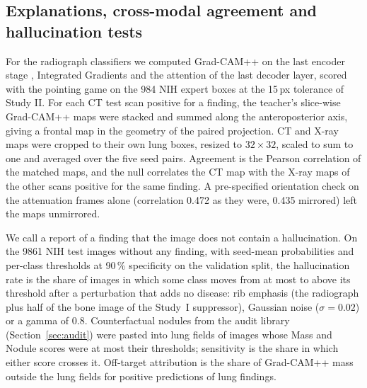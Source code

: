\subsection{Explanations, cross-modal agreement and hallucination tests}
\label{sec:xm_xai}
For the radiograph classifiers we computed Grad-CAM++ on the last encoder stage \citep{chattopadhay2018gradcampp}, Integrated Gradients
\citep{sundararajan2017axiomatic} and the attention of the last decoder layer, scored with the pointing game on the 984 NIH expert boxes
\citep{zhang2018topdown} at the 15\,px tolerance of Study II. For each CT test scan positive for a finding, the teacher's slice-wise
Grad-CAM++ maps were stacked and summed along the anteroposterior axis, giving a frontal map in the geometry of the paired projection. CT and
X-ray maps were cropped to their own lung boxes, resized to $32\times32$, scaled to sum to one and averaged over the five seed pairs.
Agreement is the Pearson correlation of the matched maps, and the null correlates the CT map with the X-ray maps of the other scans positive
for the same finding. A pre-specified orientation check on the attenuation frames alone (correlation 0.472 as they were, 0.435 mirrored)
left the maps unmirrored.

We call a report of a finding that the image does not contain a hallucination. On the \num{9861} NIH test images without any finding, with
seed-mean probabilities and per-class thresholds at 90\,\% specificity on the validation split, the hallucination rate is the share of
images in which some class moves from at most to above its threshold after a perturbation that adds no disease: rib emphasis (the radiograph
plus half of the bone image of the Study~I suppressor), Gaussian noise ($\sigma=0.02$) or a gamma of 0.8. Counterfactual nodules from the
audit library (Section~\ref{sec:audit}) were pasted into lung fields of images whose Mass and Nodule scores were at most their thresholds;
sensitivity is the share in which either score crosses it. Off-target attribution is the share of Grad-CAM++ mass outside the lung fields for
positive predictions of lung findings.

